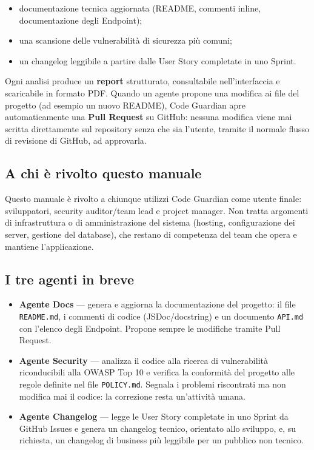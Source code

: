 \documentclass[11pt,a4paper]{article}
\newcommand{\code}[1]{\texttt{#1}}
\begin{document}
\begin{itemize}
  \item documentazione tecnica aggiornata (README, commenti inline, documentazione degli
        Endpoint);
  \item una scansione delle vulnerabilità di sicurezza più comuni;
  \item un changelog leggibile a partire dalle User Story completate in uno Sprint.
\end{itemize}

Ogni analisi produce un \textbf{report} strutturato, consultabile nell'interfaccia e
scaricabile in formato PDF. Quando un agente propone una modifica ai file del progetto
(ad esempio un nuovo README), Code Guardian apre automaticamente una \textbf{Pull Request}
su GitHub: nessuna modifica viene mai scritta direttamente sul repository senza che
sia l'utente, tramite il normale flusso di revisione di GitHub, ad approvarla.

\subsection{A chi è rivolto questo manuale}

Questo manuale è rivolto a chiunque utilizzi Code Guardian come utente finale: sviluppatori,
security auditor/team lead e project manager. Non tratta argomenti di infrastruttura o di
amministrazione del sistema (hosting, configurazione dei server, gestione del database), che
restano di competenza del team che opera e mantiene l'applicazione.

\subsection{I tre agenti in breve}

\begin{itemize}
  \item \textbf{Agente Docs} --- genera e aggiorna la documentazione del progetto: il file
        \code{README.md}, i commenti di codice (JSDoc/docstring) e un documento
        \code{API.md} con l'elenco degli Endpoint. Propone sempre le modifiche tramite
        Pull Request.
  \item \textbf{Agente Security} --- analizza il codice alla ricerca di vulnerabilità
        riconducibili alla OWASP Top 10 e verifica la conformità del progetto alle regole
        definite nel file \code{POLICY.md}. Segnala i problemi riscontrati ma non modifica
        mai il codice: la correzione resta un'attività umana.
  \item \textbf{Agente Changelog} --- legge le User Story completate in uno Sprint da GitHub
        Issues e genera un changelog tecnico, orientato allo sviluppo, e, su richiesta, un
        changelog di business più leggibile per un pubblico non tecnico.
\end{itemize}
\end{document}
